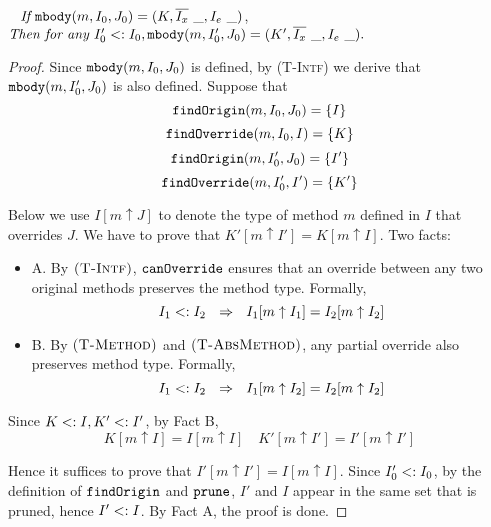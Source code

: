 \begin{lemma}~\label{lemma2_new}
$\textit{If } \texttt{mbody}(m, I_0, J_0) = (K, \overline{I_x}\ \_, I_e\ \_)$, $\textit{Then for any } I'_0 <: I_0, \texttt{mbody}(m, I'_0, J_0) = (K', \overline{I_x}\ \_, I_e\ \_).$
\end{lemma}
\begin{proof}
	
Since $\texttt{mbody}(m, I_0, J_0)$ is defined, by \textsc{(T-Intf)} we derive that $\texttt{mbody}(m, I'_0, J_0)$ is also defined. Suppose that $$\texttt{findOrigin}(m, I_0, J_0) = \{I\}$$ $$\texttt{findOverride}(m, I_0, I) = \{K\}$$
$$\texttt{findOrigin}(m, I'_0, J_0) = \{I'\}$$ $$\texttt{findOverride}(m, I'_0, I') = \{K'\}$$

Below we use $I[m\uparrow J]$ to denote the type of method $m$ defined in $I$ that overrides $J$. We have to prove that $K'[m\uparrow I'] = K[m\uparrow I]$.
Two facts:
\begin{itemize}
	\item A. By $\textsc{(T-Intf)}$, $\texttt{canOverride}$ ensures that an override between any two original methods preserves the method type. Formally, $$I_1 \subtype I_2 \ \ \Rightarrow\ \ I_1[m\uparrow I_1] = I_2[m\uparrow I_2]$$
	\item B. By $\textsc{(T-Method)}$ and $\textsc{(T-AbsMethod)}$, any partial override also preserves method type. Formally,
	  $$I_1 <: I_2\ \ \Rightarrow\ \ I_1[m\uparrow I_2] = I_2[m\uparrow I_2]$$
\end{itemize}

Since $K <: I, K' <: I'$, by Fact B, $$K[m\uparrow I] = I[m\uparrow I] \quad K'[m\uparrow I'] = I'[m\uparrow I']$$

Hence it suffices to prove that $I'[m\uparrow I'] = I[m\uparrow I]$. Since $I'_0 <: I_0$, by the definition of $\texttt{findOrigin}$ and $\texttt{prune}$, $I'$ and $I$
appear in the same set that is pruned, hence $I' <: I$. By Fact A, the proof is done.
\end{proof}


